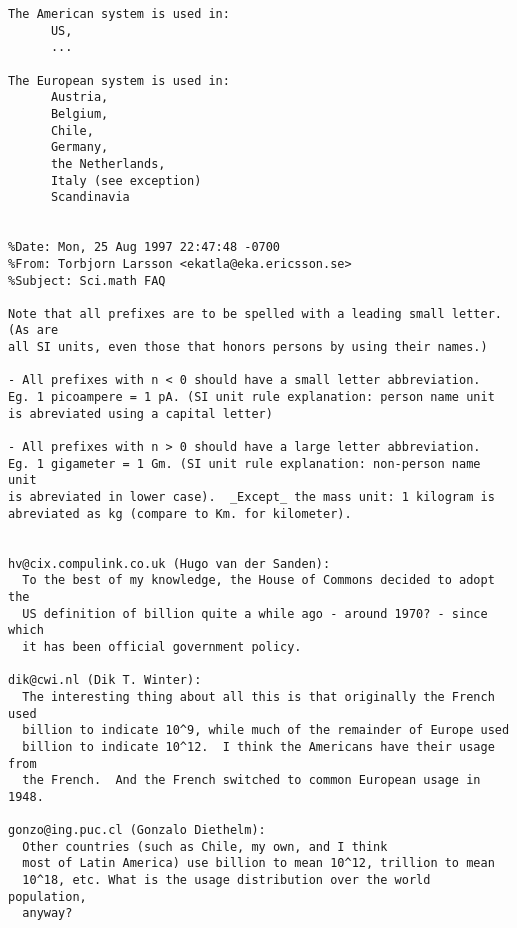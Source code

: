 \begin{verbatim}
The American system is used in:
      US,
      ...

The European system is used in:
      Austria,
      Belgium,
      Chile,
      Germany,
      the Netherlands,
      Italy (see exception)
      Scandinavia


%Date: Mon, 25 Aug 1997 22:47:48 -0700
%From: Torbjorn Larsson <ekatla@eka.ericsson.se>
%Subject: Sci.math FAQ                  

Note that all prefixes are to be spelled with a leading small letter. (As are
all SI units, even those that honors persons by using their names.)

- All prefixes with n < 0 should have a small letter abbreviation.
Eg. 1 picoampere = 1 pA. (SI unit rule explanation: person name unit
is abreviated using a capital letter)

- All prefixes with n > 0 should have a large letter abbreviation.
Eg. 1 gigameter = 1 Gm. (SI unit rule explanation: non-person name unit
is abreviated in lower case).  _Except_ the mass unit: 1 kilogram is
abreviated as kg (compare to Km. for kilometer).


hv@cix.compulink.co.uk (Hugo van der Sanden):
  To the best of my knowledge, the House of Commons decided to adopt the
  US definition of billion quite a while ago - around 1970? - since which
  it has been official government policy.

dik@cwi.nl (Dik T. Winter):
  The interesting thing about all this is that originally the French used
  billion to indicate 10^9, while much of the remainder of Europe used
  billion to indicate 10^12.  I think the Americans have their usage from
  the French.  And the French switched to common European usage in 1948.

gonzo@ing.puc.cl (Gonzalo Diethelm):
  Other countries (such as Chile, my own, and I think
  most of Latin America) use billion to mean 10^12, trillion to mean
  10^18, etc. What is the usage distribution over the world population,
  anyway?

\end{verbatim}
